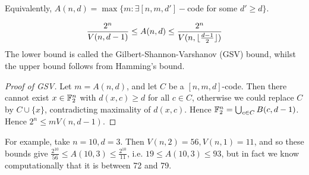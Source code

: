 \documentclass[10pt,a4paper]{article}
\begin{document}
\begin{corollary}
Equivalently, $A(n,d) = \max\{m : \exists [n,m,d']-$code for some $d'\geq d\}$.
\end{corollary}
\begin{theorem}
\begin{align*}
\frac{2^n}{V(n,d-1)} \leq A(n,d) \leq \frac{2^n}{V(n, \lfloor \frac{d-1}{2} \rfloor)}
\end{align*}
The lower bound is called the Gilbert-Shannon-Varshanov (GSV) bound, whilst the upper bound follows from Hamming's bound.
\end{theorem}
\begin{proof}[Proof of GSV]
Let $m = A(n,d)$, and let $C$ be a $[n,m,d]$-code. Then there cannot exist $x \in \mathbb{F}_2^n$ with $d(x,c) \geq d$ for all $c \in C$, otherwise we could replace $C$ by $C \cup \{x\}$, contradicting maximality of $d(x,c)$. Hence $\mathbb{F}_2^n = \bigcup_{c\in C} B(c, d-1)$. Hence $2^n \leq m V(n, d-1)$.
\end{proof}
For example, take $n=10, d=3$. Then $V(n,2) = 56, V(n,1)=11$, and so these bounds give $\frac{2^10}{56} \leq A(10,3) \leq \frac{2^10}{11}$, i.e. $19\leq A(10,3)\leq 93$, but in fact we know computationally that it is between 72 and 79.
\end{document}
